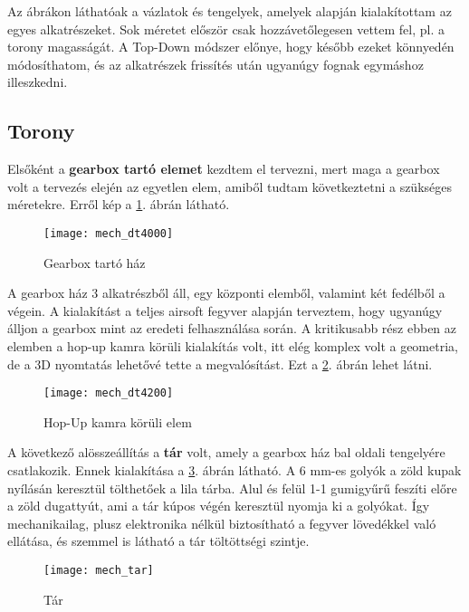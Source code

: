 Az ábrákon láthatóak a vázlatok és tengelyek, amelyek alapján kialakítottam az egyes alkatrészeket. Sok méretet először csak hozzávetőlegesen vettem fel, pl. a torony magasságát. A Top-Down módszer előnye, hogy később ezeket könnyedén módosíthatom, és az alkatrészek frissítés után ugyanúgy fognak egymáshoz illeszkedni.


\subsection{Torony}

Elsőként a \textbf{gearbox tartó elemet} kezdtem el tervezni, mert maga a gearbox volt a tervezés elején az egyetlen elem, amiből tudtam következtetni a szükséges méretekre. Erről kép a \ref{fig:mech_dt4000}. ábrán látható. 

\begin{figure}[h!]
	\centering
	\texttt{[image: mech\_dt4000]}
	\caption{Gearbox tartó ház}
	\label{fig:mech_dt4000}
\end{figure}

A gearbox ház 3 alkatrészből áll, egy központi elemből, valamint két fedélből a végein. A kialakítást a teljes airsoft fegyver alapján terveztem, hogy ugyanúgy álljon a gearbox mint az eredeti felhasználása során. A kritikusabb rész ebben az elemben a hop-up kamra körüli kialakítás volt, itt elég komplex volt a geometria, de a 3D nyomtatás lehetővé tette a megvalósítást. Ezt a \ref{fig:mech_dt4200}. ábrán lehet látni.


\begin{figure}[h!]
	\centering
	\texttt{[image: mech\_dt4200]}
	\caption{Hop-Up kamra körüli elem}
	\label{fig:mech_dt4200}
\end{figure}


A következő alösszeállítás a \textbf{tár} volt, amely a gearbox ház bal oldali tengelyére csatlakozik. Ennek kialakítása a \ref{fig:mech_tar}. ábrán látható. A 6 mm-es golyók a zöld kupak nyílásán keresztül tölthetőek a lila tárba. Alul és felül 1-1 gumigyűrű feszíti előre a zöld dugattyút, ami a tár kúpos végén keresztül nyomja ki a golyókat. Így mechanikailag, plusz elektronika nélkül biztosítható a fegyver lövedékkel való ellátása, és szemmel is látható a tár töltöttségi szintje.

\begin{figure}[h!]
	\centering
	\texttt{[image: mech\_tar]}
	\caption{Tár}
	\label{fig:mech_tar}
\end{figure}

